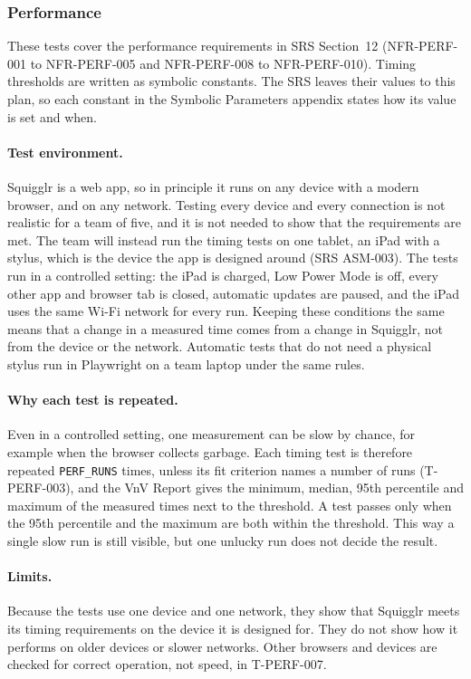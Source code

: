 \documentclass[12pt, titlepage]{article}
\begin{document}
\subsubsection{Performance}
\label{sec:perf-tests}

These tests cover the performance requirements in SRS Section~12
(NFR-PERF-001 to NFR-PERF-005 and NFR-PERF-008 to NFR-PERF-010). Timing
thresholds are written as symbolic constants. The SRS leaves their values to
this plan, so each constant in the Symbolic Parameters appendix states how its
value is set and when.

\paragraph{Test environment.} Squigglr is a web app, so in principle it runs on
any device with a modern browser, and on any network. Testing every device and
every connection is not realistic for a team of five, and it is not needed to
show that the requirements are met. The team will instead run the timing tests
on one tablet, an iPad with a stylus, which is the device the app is designed
around (SRS ASM-003). The tests run in a controlled setting: the iPad is
charged, Low Power Mode is off, every other app and browser tab is closed,
automatic updates are paused, and the iPad uses the same Wi-Fi network for
every run. Keeping these conditions the same means that a change in a measured
time comes from a change in Squigglr, not from the device or the network.
Automatic tests that do not need a physical stylus run in Playwright on a team
laptop under the same rules.

\paragraph{Why each test is repeated.} Even in a controlled setting, one
measurement can be slow by chance, for example when the browser collects
garbage. Each timing test is therefore repeated \texttt{PERF\_RUNS} times,
unless its fit criterion names a number of runs (T-PERF-003), and
the VnV Report gives the minimum, median, 95th percentile and maximum of the
measured times next to the threshold. A test passes only when the 95th
percentile and the maximum are both within the threshold. This way a single
slow run is still visible, but one unlucky run does not decide the result.

\paragraph{Limits.} Because the tests use one device and one network, they show
that Squigglr meets its timing requirements on the device it is designed for.
They do not show how it performs on older devices or slower networks. Other
browsers and devices are checked for correct operation, not speed, in
T-PERF-007.
\end{document}
